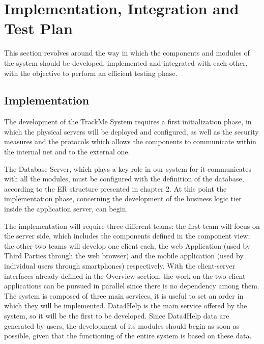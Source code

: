 \chapter{Implementation, Integration and Test Plan}
This section revolves around the way in which the components and modules of the system should be developed, implemented and integrated with each other, with the objective to perform an efficient testing phase.
\section{Implementation}

The development of the TrackMe System requires a first initialization phase, in which the physical servers will be deployed and configured, 
as well as the security measures and the protocols which allows the components to communicate within the internal net and to the external one.

The Database Server, which plays a key role in our system for it communicates with all the modules, must be configured with the definition of the database, according to the ER structure presented in chapter 2. At this point the implementation phase, concerning the development of the business logic tier inside the application server, can begin.

\vspace{10mm}

The implementation will require three different teams: the first team will focus on the server side, which includes the components defined in the component view; the other two teams will develop one client each, the web Application (used by Third Parties through the web browser) and the mobile application (used by individual users through smartphones) respectively. With the client-server interfaces already defined in the Overview section, the work on the two client applications can be pursued in parallel since there is no dependency among them. 
The system is composed of three main services, it is useful to set an order in which they will be implemented. Data4Help is the main service offered by the system, so it will be the first to be developed. Since Data4Help data are generated by users, the development of its modules should begin as soon as possible, given that the functioning of the entire system is based on these data.

